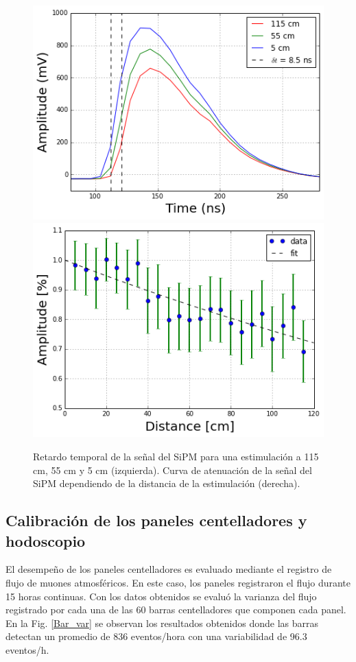 \begin{figure}[h!]
\centering
\includegraphics[scale=0.5]{Figures/arrivT.png}
\includegraphics[scale=0.5]{Figures/Attenuation.png}
\caption{Retardo temporal de la señal del SiPM para una estimulación a 115 cm, 55 cm y 5 cm (izquierda). Curva de atenuación de la señal del SiPM dependiendo de la distancia de la estimulación (derecha).}
\label{AttCur}
\end{figure}

\subsection{Calibración de los paneles centelladores y hodoscopio}

El desempeño de los paneles centelladores es evaluado mediante el registro de flujo de muones atmosféricos. En este caso, los paneles registraron el flujo durante 15 horas continuas. Con los datos obtenidos se evaluó la varianza del flujo registrado por cada una de las 60 barras centelladores que componen cada panel. En la Fig. \ref{Bar_var} se observan los resultados obtenidos donde las barras detectan un promedio de 836 eventos/hora con una variabilidad de 96.3 eventos/h.

